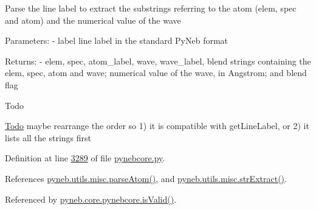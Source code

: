 \begin{DoxyVerb}Parse the line label to extract the substrings referring to the atom (elem, spec and atom)
and the numerical value of the wave

Parameters:
    - label    line label in the standard PyNeb format

Returns:
    - elem, spec, atom_label, wave, wave_label, blend  strings containing the elem, spec, atom and 
                                                          wave; numerical value of the wave, 
                                                          in Angstrom; and blend flag 
\end{DoxyVerb}
 \begin{DoxyRefDesc}{Todo}
\item[\hyperlink{todo__todo000001}{Todo}]maybe rearrange the order so 1) it is compatible with get\-Line\-Label, or 2) it lists all the strings first \end{DoxyRefDesc}


Definition at line \hyperlink{pynebcore_8py_source_l03289}{3289} of file \hyperlink{pynebcore_8py_source}{pynebcore.\-py}.



References \hyperlink{misc_8py_source_l00159}{pyneb.\-utils.\-misc.\-parse\-Atom()}, and \hyperlink{misc_8py_source_l00180}{pyneb.\-utils.\-misc.\-str\-Extract()}.



Referenced by \hyperlink{pynebcore_8py_source_l03335}{pyneb.\-core.\-pynebcore.\-is\-Valid()}.


